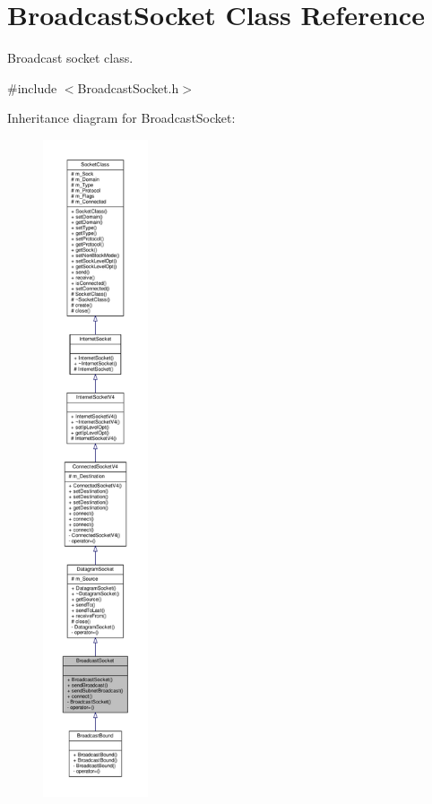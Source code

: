 \hypertarget{classBroadcastSocket}{}\section{Broadcast\+Socket Class Reference}
\label{classBroadcastSocket}


Broadcast socket class.  




{\ttfamily \#include $<$Broadcast\+Socket.\+h$>$}



Inheritance diagram for Broadcast\+Socket\+:\nopagebreak
\begin{figure}[H]
\begin{center}
\leavevmode
\includegraphics[height=550pt]{classBroadcastSocket__inherit__graph}
\end{center}
\end{figure}
